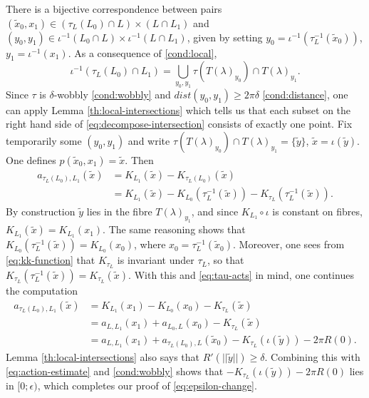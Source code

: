 \documentclass[10pt,letterpaper]{article}
\begin{document}
There is a bijective correspondence between pairs $(\tilde{x}_0,x_1) \in
(\tau_L(L_0) \cap L) \times (L \cap L_1)$ and $(y_0,y_1) \in \iota^{-1}(L_0
\cap L) \times \iota^{-1}(L \cap L_1)$, given by setting $y_0 =
\iota^{-1}(\tau_L^{-1}(\tilde{x}_0))$, $y_1 = \iota^{-1}(x_1)$. As a
consequence of \ref{cond:local},
\begin{equation} \label{eq:decompose-intersection}
\iota^{-1}(\tau_L(L_0) \cap L_1) = \bigcup_{y_0,y_1} \tau(T(\lambda)_{y_0})
\cap T(\lambda)_{y_1}.
\end{equation}
Since $\tau$ is $\delta$-wobbly \ref{cond:wobbly} and $dist(y_0,y_1) \geq
2\pi\delta$ \ref{cond:distance}, one can apply Lemma
\ref{th:local-intersections} which tells us that each subset on the right hand
side of \eqref{eq:decompose-intersection} consists of exactly one point. Fix
temporarily some $(y_0,y_1)$ and write $\tau(T(\lambda)_{y_0}) \cap
T(\lambda)_{y_1} = \{\tilde{y}\}$, $\tilde{x} = \iota(\tilde{y})$. One defines
$p(\tilde{x}_0,x_1) = \tilde{x}$. Then
\begin{align*}
 a_{\tau_L(L_0),L_1}(\tilde{x})
 & = K_{L_1}(\tilde{x}) - K_{\tau_L(L_0)}(\tilde{x}) \\
 & = K_{L_1}(\tilde{x}) - K_{L_0}(\tau_L^{-1}(\tilde{x}))
 - K_{\tau_L}(\tau_L^{-1}(\tilde{x})).
\end{align*}
By construction $\tilde{y}$ lies in the fibre $T(\lambda)_{y_1}$, and since
$K_{L_1} \circ \iota$ is constant on fibres, $K_{L_1}(\tilde{x}) =
K_{L_1}(x_1)$. The same reasoning shows that $K_{L_0}(\tau_L^{-1}(\tilde{x})) =
K_{L_0}(x_0)$, where $x_0 = \tau_L^{-1}(\tilde{x}_0)$. Moreover, one sees from
\eqref{eq:kk-function} that $K_{\tau_L}$ is invariant under $\tau_L$, so that
$K_{\tau_L}(\tau_L^{-1}(\tilde{x})) = K_{\tau_L}(\tilde{x})$. With this and
\eqref{eq:tau-acts} in mind, one continues the computation
\begin{equation} \label{eq:finish-action}
\begin{aligned}
 a_{\tau_L(L_0),L_1}(\tilde{x})
 & = K_{L_1}(x_1) - K_{L_0}(x_0) - K_{\tau_L}(\tilde{x}) \\
 & = a_{L,L_1}(x_1) + a_{L_0,L}(x_0) - K_{\tau_L}(\tilde{x}) \\
 & = a_{L,L_1}(x_1) + a_{\tau_L(L_0),L}(\tilde{x}_0) - K_{\tau_L}(\iota(\tilde{y}))
 - 2\pi R(0).
\end{aligned}
\end{equation}
Lemma \ref{th:local-intersections} also says that $R'(||\tilde{y}||) \geq
\delta$. Combining this with \eqref{eq:action-estimate} and \ref{cond:wobbly}
shows that $- K_{\tau_L}(\iota(\tilde{y})) - 2\pi R(0)$ lies in $[0;\epsilon)$,
which completes our proof of \eqref{eq:epsilon-change}.
\end{document}
